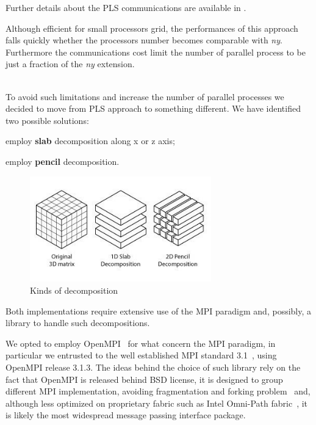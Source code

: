 Further details about the PLS communications are available in \cite[\nopp chapter 4.2]{cpl:presentazione}. \\
 \par
Although efficient for small processors grid, the performances of this approach falls quickly whether the processors number becomes comparable with \emph{ny}.  Furthermore the communications cost limit the number of parallel process to be just a fraction of the \emph{ny} extension. \\~\\
\par
To avoid such limitations and increase the number of parallel processes we decided to move from PLS approach to something different.
We have identified two possible solutions:
\begin{description}
  \item employ \textbf{slab} decomposition along x or z axis;
  \item employ \textbf{pencil} decomposition.
\end{description}
\begin{figure}
\begin{center}
\includegraphics[width=0.7\textwidth]{grafici/decomp_example}
\caption{Kinds of decomposition}
\label{decomposition:example}
\end{center}
\end{figure}
Both implementations require extensive use of the MPI paradigm and, possibly, a library to handle such decompositions.
\par
We opted to employ OpenMPI~\cite{openmpi} for what concern the MPI paradigm, in particular we entrusted to the well established MPI standard 3.1~\cite{MPI:standard}, using OpenMPI release 3.1.3.
The ideas behind the choice of such library rely on the fact that OpenMPI is released behind BSD license, it is designed to group different MPI implementation, avoiding fragmentation and forking problem~\cite{faq:openmpi} and, although less optimized on proprietary fabric such as Intel Omni-Path fabric~\cite{intel:omnipath}\cite{intel:intelmpivsopenmpi}, it is likely the most widespread message passing interface package.
